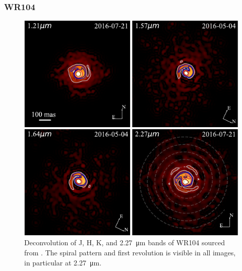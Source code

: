 \subsubsection{WR104}

\begin{figure}[h]
  \centering
  \includegraphics[]{assets/systems/soulain-2018-wr104.pdf}
  \caption[\textit{Spiral structure of WR104 \parencite{soulainSPHEREViewWolfRayet2018}}]{Deconvolution of J, H, K, and \SI{2.27}{\micro\metre} bands of WR104 sourced from \textcite{soulainSPHEREViewWolfRayet2018}. The spiral pattern and first revolution is visible in all images, in particular at \SI{2.27}{\micro\metre}.}
  \label{fig:soulain-wr104}
\end{figure}

